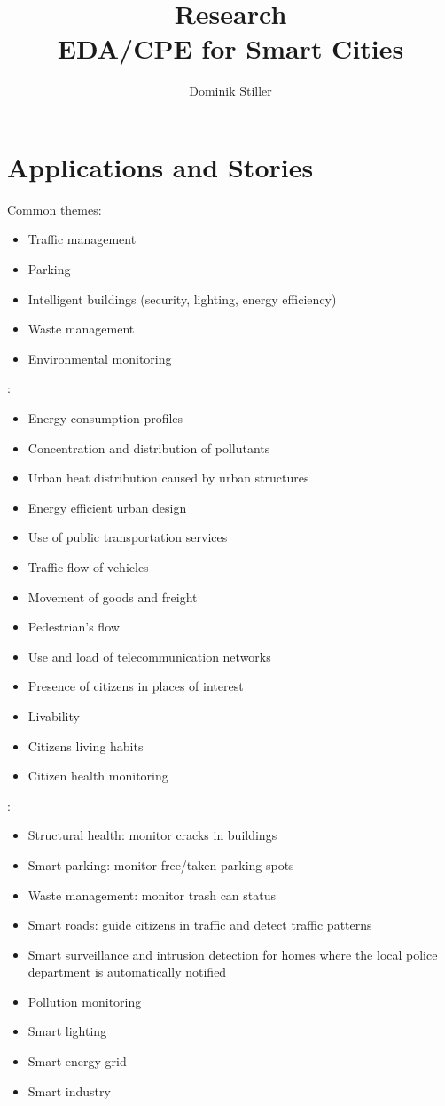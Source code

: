 \documentclass[]{scrartcl}
\title{Research \\ EDA/CPE for Smart Cities}
\author{Dominik Stiller}
\begin{document}
\maketitle


\section{Applications and Stories}

Common themes:
\begin{itemize}
	\item Traffic management
	\item Parking
	\item Intelligent buildings (security, lighting, energy efficiency)
	\item Waste management
	\item Environmental monitoring
\end{itemize}

\cite[p.~2]{Morales.2015}:
\begin{itemize}
	\item Energy consumption profiles
	\item Concentration and distribution of pollutants
	\item Urban heat distribution caused by urban structures
	\item Energy efficient urban design
	\item Use of public transportation services
	\item Traffic flow of vehicles
	\item Movement of goods and freight
	\item Pedestrian's flow
	\item Use and load of telecommunication networks
	\item Presence of citizens in places of interest
	\item Livability
	\item Citizens living habits
	\item Citizen health monitoring
\end{itemize}

\cite[p.~8~ff.]{Ahmed.2018}:
\begin{itemize}
	\item Structural health: monitor cracks in buildings
	\item Smart parking: monitor free/taken parking spots
	\item Waste management: monitor trash can status
	\item Smart roads: guide citizens in traffic and detect traffic patterns
	\item Smart surveillance and intrusion detection for homes where the local police department is automatically notified
	\item Pollution monitoring
	\item Smart lighting
	\item Smart energy grid
	\item Smart industry
\end{itemize}
\end{document}

